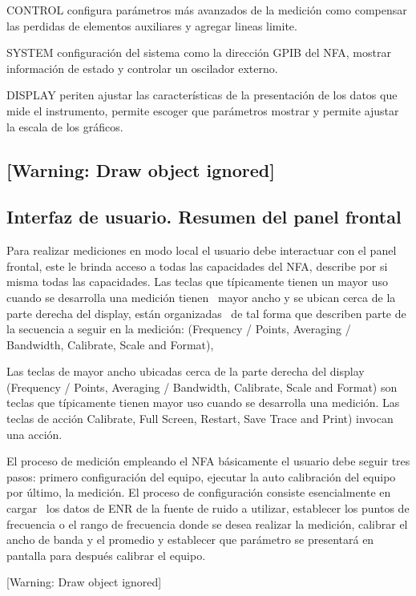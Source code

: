 \documentclass[paper=letter,oneside,fontsize=10pt,parskip=full]{article}
\begin{document}
CONTROL configura parámetros más avanzados de la medición como compensar las perdidas de elementos auxiliares y agregar
lineas limite.

SYSTEM configuración del sistema como la dirección GPIB del NFA, mostrar información de estado y controlar un oscilador
externo.

DISPLAY periten ajustar las características de la presentación de los datos que mide el instrumento, permite escoger que
parámetros mostrar y permite ajustar la escala de los gráficos.


\bigskip

\clearpage\subsection[]{[Warning: Draw object ignored]}
\clearpage\subsection[Interfaz de usuario. Resumen del panel frontal]{Interfaz de usuario. Resumen del panel frontal}
Para realizar mediciones en modo local el usuario debe interactuar con el panel frontal, este le brinda acceso a todas
las capacidades del NFA, describe por si misma todas las capacidades. Las teclas que típicamente tienen un mayor uso
cuando se desarrolla una medición tienen \ mayor ancho y se ubican cerca de la parte derecha del display, están
organizadas \ de tal forma que describen parte de la secuencia a seguir en la medición: (Frequency / Points, Averaging
/ Bandwidth, Calibrate, Scale and Format), 

Las teclas de mayor ancho ubicadas cerca de la parte derecha del display (Frequency / Points, Averaging / Bandwidth,
Calibrate, Scale and Format) son teclas que típicamente tienen mayor uso cuando se desarrolla una medición. Las teclas
de acción Calibrate, Full Screen, Restart, Save Trace and Print) invocan una acción.

El proceso de medición empleando el NFA básicamente el usuario debe seguir tres pasos: primero configuración del equipo,
ejecutar la auto calibración del equipo por último, la medición. El proceso de configuración consiste esencialmente en
cargar \ los datos de ENR de la fuente de ruido a utilizar, establecer los puntos de frecuencia o el rango de
frecuencia donde se desea realizar la medición, calibrar el ancho de banda y el promedio y establecer que parámetro se
presentará en pantalla para después calibrar el equipo.

[Warning: Draw object ignored]
\end{document}

